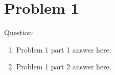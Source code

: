 \documentclass[12pt,letterpaper]{article}
\begin{document}
%


\section*{Problem 1}
Question: 
\begin{enumerate}
  \item
   Problem 1 part 1 answer here.
  \item
    Problem 1 part 2 answer here.

\end{enumerate}
\end{document}
